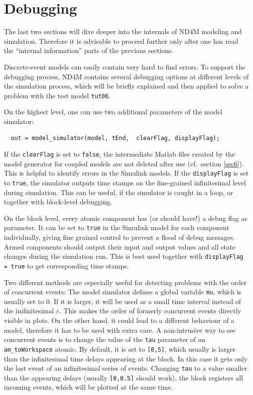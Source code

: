 \documentclass[12pt,oneside,a4paper,bibtotoc,BCOR=0pt,DIV=20]{scrreprt}
\newcommand{\cft}[1]{\mbox{\texttt{#1}}}   %
\newcommand{\defi}[1]{``#1''}
\newcommand{\epsi}{\varepsilon}
\begin{document}
\chapter{Debugging} \label{sec8}

The last two sections will dive deeper into the internals of ND4M modeling and
simulation. Therefore it is advisable to proceed further only after one has
read the \defi{internal information} parts of the previous sections.

Discrete-event models can easily contain very hard to find errors. To support
the debugging process, ND4M contains several debugging options at different
levels of the simulation process, which will be briefly explained and then
applied to solve a problem with the test model \cft{tut06}.

On the highest level, one can use two additional parameters of the model
simulator:
\begin{verbatim}
  out = model_simulator(model, tEnd,  clearFlag, displayFlag);
\end{verbatim}
If the \cft{clearFlag} is set to \cft{false}, the intermediate Matlab files
created by the model generator for coupled models are not deleted after use
(cf.\ section \ref{sec6}). This is helpful to identify errors in the Simulink
models. If the \cft{displayFlag} is set to \cft{true}, the simulator outputs
time stamps on the fine-grained infinitesimal level during simulation. This can
be useful, if the simulator is caught in a loop, or together with block-level
debugging.

On the block level, every atomic component has (or should have!) a debug flag
as parameter. It can be set to \cft{true} in the Simulink model for each
component individually, giving fine grained control to prevent a flood of debug
messages.  Armed components should output their input and output values and all
state changes during the simulation run. This is best used together with
\cft{displayFlag = true} to get corresponding time stamps.

Two different methods are especially useful for detecting problems with the
order of concurrent events: The model simulator defines a global variable
\cft{mu}, which is usually set to $0$. If it is larger, it will be used as a
small time interval instead of the inifinitesimal $\epsi$. This makes the order
of formerly concurrent events directly visible in plots. On the other hand, it
could lead to a different behaviour of a model, therefore it has to be used
with extra care. A non-intrusive way to see concurrent events is to change the
value of the \cft{tau} parameter of an \cft{am\_toWorkspace} atomic. By
default, it is set to \cft{[0,5]}, which usually is larger than the
infinitesimal time delays appearing at the block. In this case it gets only the
last event of an infinitesimal series of events. Changing \cft{tau} to a value
smaller than the appearing delays (usually \cft{[0,0.5]} should work), the
block registers all incoming events, which will be plotted at the same time.
\end{document}
